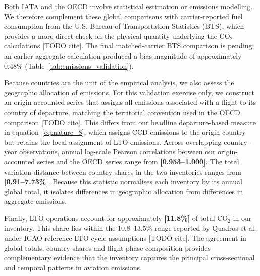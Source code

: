\documentclass[12pt]{article}
\begin{document}
Both IATA and the OECD involve statistical estimation or emissions modelling.
We therefore complement these global comparisons with carrier-reported fuel
consumption from the U.S. Bureau of Transportation Statistics (BTS), which
provides a more direct check on the physical quantity underlying the CO$_2$
calculations [TODO cite]. The final matched-carrier BTS comparison is pending;
an earlier aggregate calculation produced a bias magnitude of approximately
0.48\% (Table~\ref{tab:emissions_validation}).

Because countries are the unit of the empirical analysis, we also assess the
geographic allocation of emissions. For this validation exercise only, we
construct an origin-accounted series that assigns all emissions associated
with a flight to its country of departure, matching the territorial convention
used in the OECD comparison [TODO cite]. This differs from our headline
departure-based measure in equation~\eqref{eq:nature_8}, which assigns CCD
emissions to the origin country but retains the local assignment of LTO
emissions. Across overlapping country--year observations, annual log-scale
Pearson correlations between our origin-accounted series and the OECD series
range from \textbf{[0.953--1.000]}. The total variation distance between
country shares in the two inventories ranges from
\textbf{[0.91--7.73\%]}. Because this statistic normalises each inventory by
its annual global total, it isolates differences in geographic allocation
from differences in aggregate emissions.

Finally, LTO operations account for approximately \textbf{[11.8\%]} of total
CO$_2$ in our inventory. This share lies within the 10.8--13.5\% range reported
by Quadros et al. under ICAO reference LTO-cycle assumptions [TODO cite]. The
agreement in global totals, country shares and flight-phase composition
provides complementary evidence that the inventory captures the principal
cross-sectional and temporal patterns in aviation emissions.
\end{document}
